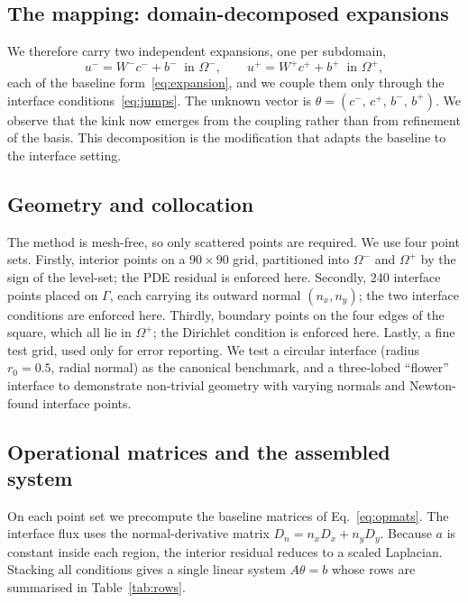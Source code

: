\documentclass[preprint,12pt,authoryear]{elsarticle}
\begin{document}
\subsection{The mapping: domain-decomposed expansions}
\label{subsec:mapping}
We therefore carry two independent expansions, one per subdomain,
\begin{equation}
u^- = W^- c^- + b^- \ \text{ in } \Omega^-,
\qquad
u^+ = W^+ c^+ + b^+ \ \text{ in } \Omega^+,
\label{eq:two-exp}
\end{equation}
each of the baseline form~\eqref{eq:expansion}, and we couple them only through the interface conditions~\eqref{eq:jumps}. The unknown vector is $\theta=(c^-,\,c^+,\,b^-,\,b^+)$. We observe that the kink now emerges from the coupling rather than from refinement of the basis. This decomposition is the modification that adapts the baseline to the interface setting.

\subsection{Geometry and collocation}
\label{subsec:collocation}
The method is mesh-free, so only scattered points are required. We use four point sets. Firstly, interior points on a $90\times90$ grid, partitioned into $\Omega^-$ and $\Omega^+$ by the sign of the level-set; the PDE residual is enforced here. Secondly, $240$ interface points placed on $\Gamma$, each carrying its outward normal $(n_x,n_y)$; the two interface conditions are enforced here. Thirdly, boundary points on the four edges of the square, which all lie in $\Omega^+$; the Dirichlet condition is enforced here. Lastly, a fine test grid, used only for error reporting. We test a circular interface (radius $r_0=0.5$, radial normal) as the canonical benchmark, and a three-lobed ``flower'' interface to demonstrate non-trivial geometry with varying normals and Newton-found interface points.

\subsection{Operational matrices and the assembled system}
\label{subsec:assembly}
On each point set we precompute the baseline matrices of Eq.~\eqref{eq:opmats}. The interface flux uses the normal-derivative matrix $D_n = n_x D_x + n_y D_y$. Because $a$ is constant inside each region, the interior residual reduces to a scaled Laplacian. Stacking all conditions gives a single linear system $A\theta=b$ whose rows are summarised in Table~\ref{tab:rows}.
\end{document}
